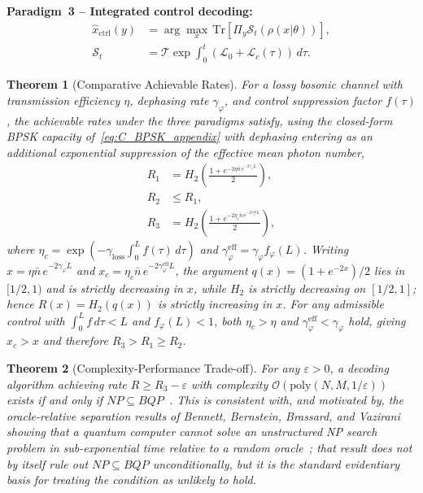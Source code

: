 \documentclass[journal,twocolumn]{IEEEtran}
\theoremstyle{definition}
\theoremstyle{plain}
\newtheorem{theorem}{Theorem}[section]
\newcommand{\Tr}{\mathrm{Tr}}
\begin{document}
\medskip\noindent\textbf{Paradigm~3 -- Integrated control decoding:}
\begin{align}
  \hat x_{\mathrm{ctrl}}(y) &= \arg\max_x\,
    \Tr[\Pi_y \mathcal{S}_t(\rho(x|\theta))], \nonumber\\
  \mathcal{S}_t &= \mathcal{T}\!\exp\!\int_0^t
    (\mathcal{L}_0 + \mathcal{L}_c(\tau))\,d\tau.
  \label{eq:paradigm3}
\end{align}

\begin{theorem}[Comparative Achievable Rates]
\label{thm:comparative}
For a lossy bosonic channel with transmission efficiency $\eta$,
dephasing rate $\gamma_\varphi$, and control suppression factor
$f(\tau)$, the achievable rates under the three paradigms satisfy,
using the closed-form BPSK capacity of~\eqref{eq:C_BPSK_appendix}
with dephasing entering as an additional exponential suppression of
the effective mean photon number,
\begin{align}
  R_1 &= H_2\!\left(\frac{1+e^{-2\eta\bar n\,
      e^{-2\gamma_\varphi L}}}{2}\right),
    \nonumber\\
  R_2 &\le R_1, \nonumber\\
  R_3 &= H_2\!\left(\frac{1+e^{-2\eta_c\bar n\,
      e^{-2\gamma_\varphi^{\mathrm{eff}}L}}}{2}\right),
  \label{eq:rates}
\end{align}
where $\eta_c = \exp(-\gamma_{\mathrm{loss}}\int_0^L f(\tau)\,d\tau)$
and $\gamma_\varphi^{\mathrm{eff}} = \gamma_\varphi f_\varphi(L)$.
Writing $x = \eta\bar n\,e^{-2\gamma_\varphi L}$ and
$x_c = \eta_c\bar n\,e^{-2\gamma_\varphi^{\mathrm{eff}}L}$, the
argument $q(x)=(1+e^{-2x})/2$ lies in $[1/2,1)$ and is strictly
decreasing in $x$, while $H_2$ is strictly decreasing on $[1/2,1]$;
hence $R(x) = H_2(q(x))$ is strictly increasing in $x$. For any
admissible control with $\int_0^L f\,d\tau < L$ and $f_\varphi(L)<1$,
both $\eta_c>\eta$ and $\gamma_\varphi^{\mathrm{eff}}<\gamma_\varphi$
hold, giving $x_c > x$ and therefore $R_3 > R_1 \ge R_2$.
\end{theorem}

\begin{theorem}[Complexity-Performance Trade-off]
\label{thm:complexity}
For any $\varepsilon > 0$, a decoding algorithm achieving rate
$R \ge R_3 - \varepsilon$ with complexity
$\mathcal{O}(\mathrm{poly}(N, M, 1/\varepsilon))$ exists if and
only if $NP \subseteq BQP$~\cite{aaronson2005}. This is consistent
with, and motivated by, the oracle-relative separation results of
Bennett, Bernstein, Brassard, and Vazirani showing that a quantum
computer cannot solve an unstructured NP search problem in
sub-exponential time relative to a random oracle~\cite{bennett1997};
that result does not by itself rule out $NP\subseteq BQP$
unconditionally, but it is the standard evidentiary basis for
treating the condition as unlikely to hold.
\end{theorem}
\end{document}
